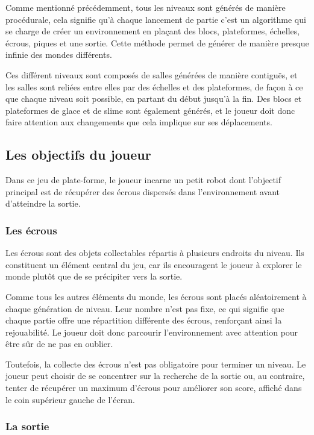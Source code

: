 \documentclass[10pt]{report}
\begin{document}
Comme mentionné précédemment, tous les niveaux sont générés de manière procédurale, cela signifie qu'à chaque
lancement de partie c'est un algorithme qui se charge de créer un environnement en plaçant des blocs, plateformes,
échelles, écrous, piques et une sortie.
Cette méthode permet de générer de manière presque infinie des mondes différents.

Ces différent niveaux sont composés de salles générées de manière 
contiguës, et les salles sont reliées entre elles par des échelles et des
plateformes, de façon à ce que chaque niveau soit possible, en partant du
début jusqu'à la fin.
Des blocs et plateformes de glace et de slime sont
également générés, et le joueur doit donc faire attention aux changements 
que cela implique sur ses déplacements.


\subsection{Les objectifs du joueur}

Dans ce jeu de plate-forme, le joueur incarne un petit robot dont l’objectif principal est de récupérer des écrous
dispersés dans l’environnement avant d’atteindre la sortie.


\subsubsection{Les écrous}

Les écrous sont des objets collectables répartis à plusieurs endroits du niveau.
Ils constituent un élément central du jeu, car ils encouragent le joueur à explorer le monde plutôt que de se
précipiter vers la sortie.

Comme tous les autres éléments du monde, les écrous sont placés aléatoirement à chaque génération de niveau.
Leur nombre n’est pas fixe, ce qui signifie que chaque partie offre une répartition différente des écrous,
renforçant ainsi la rejouabilité.
Le joueur doit donc parcourir l’environnement avec attention pour être sûr de ne pas en oublier.

Toutefois, la collecte des écrous n’est pas obligatoire pour terminer un niveau.
Le joueur peut choisir de se concentrer sur la recherche de la sortie ou, au contraire, tenter de récupérer
un maximum d’écrous pour améliorer son score, affiché dans le coin supérieur gauche de l’écran.


\subsubsection{La sortie}
\end{document}

